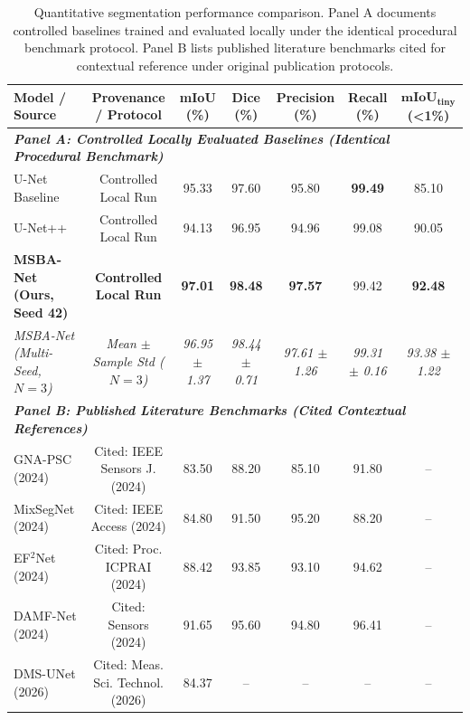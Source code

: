 \documentclass{ieeeaccess}
\begin{document}
\begin{table}[!t]
\centering
\setlength{\tabcolsep}{3pt}
\fontsize{7.8pt}{9.8pt}\selectfont
\caption{Quantitative segmentation performance comparison. Panel A documents controlled baselines trained and evaluated locally under the identical procedural benchmark protocol. Panel B lists published literature benchmarks cited for contextual reference under original publication protocols.}
\label{tab:benchmark}
\begin{tabular*}{\textwidth}{@{\extracolsep{\fill}}lcccccc@{}}
\toprule
\textbf{Model / Source} & \textbf{Provenance / Protocol} & \textbf{mIoU (\%)} & \textbf{Dice (\%)} & \textbf{Precision (\%)} & \textbf{Recall (\%)} & $\mathbf{mIoU}_{\mathbf{tiny}}$ \textbf{(<1\%)} \\
\midrule
\multicolumn{7}{l}{\textit{\textbf{Panel A: Controlled Locally Evaluated Baselines (Identical Procedural Benchmark)}}} \\
U-Net Baseline \cite{ronneberger2015unet} & Controlled Local Run & 95.33 & 97.60 & 95.80 & \textbf{99.49} & 85.10 \\
U-Net++ \cite{zhou2019unetplusplus} & Controlled Local Run & 94.13 & 96.95 & 94.96 & 99.08 & 90.05 \\
\textbf{MSBA-Net (Ours, Seed 42)} & \textbf{Controlled Local Run} & \textbf{97.01} & \textbf{98.48} & \textbf{97.57} & 99.42 & \textbf{92.48} \\
\textit{MSBA-Net (Multi-Seed, $N=3$)} & \textit{Mean $\pm$ Sample Std ($N=3$)} & \textit{96.95 $\pm$ 1.37} & \textit{98.44 $\pm$ 0.71} & \textit{97.61 $\pm$ 1.26} & \textit{99.31 $\pm$ 0.16} & \textit{93.38 $\pm$ 1.22} \\
\midrule
\multicolumn{7}{l}{\textit{\textbf{Panel B: Published Literature Benchmarks (Cited Contextual References)}}} \\
GNA-PSC (2024) \cite{zhang2024gnapsc} & Cited: IEEE Sensors J. (2024) & 83.50 & 88.20 & 85.10 & 91.80 & -- \\
MixSegNet (2024) \cite{zhou2024mixsegnet} & Cited: IEEE Access (2024) & 84.80 & 91.50 & 95.20 & 88.20 & -- \\
EF$^2$Net (2024) \cite{li2024ef2net} & Cited: Proc. ICPRAI (2024) & 88.42 & 93.85 & 93.10 & 94.62 & -- \\
DAMF-Net (2024) \cite{liu2024damfnet} & Cited: Sensors (2024) & 91.65 & 95.60 & 94.80 & 96.41 & -- \\
DMS-UNet (2026) \cite{liu2026dmsunet} & Cited: Meas. Sci. Technol. (2026) & 84.37 & -- & -- & -- & -- \\
\bottomrule
\end{tabular*}
\end{table}
\end{document}

